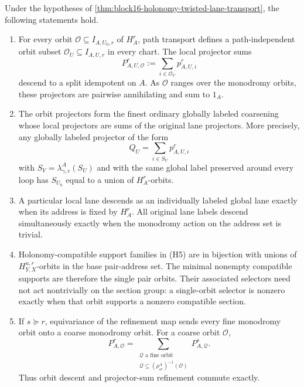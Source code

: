 \begin{theorem}
\label{thm:block16-orbit-descent}
Under the hypotheses of
\cref{thm:block16-holonomy-twisted-lane-transport}, the following statements
hold.

\begin{enumerate}[label=\textup{(O\arabic*)}]
\item For every orbit \(\mathcal O\subseteq I_{A,U_0,r}\) of \(H_A^r\), path
transport defines a path-independent orbit subset
\(\mathcal O_U\subseteq I_{A,U,r}\) in every chart.  The local projector sums
\[
 P^r_{A,U,\mathcal O}
 :=
 \sum_{i\in\mathcal O_U}p^r_{A,U,i}
\]
descend to a split idempotent on \(A\).  As \(\mathcal O\) ranges over the
monodromy orbits, these projectors are pairwise annihilating and sum to
\(1_A\).

\item The orbit projectors form the finest ordinary globally labeled
coarsening whose local projectors are sums of the original lane projectors.
More precisely, any globally labeled projector of the form
\[
 Q_U=\sum_{i\in S_U}p^r_{A,U,i}
\]
with \(S_V=\lambda^A_{\gamma,r}(S_U)\) and with the same global label preserved
around every loop has \(S_{U_0}\) equal to a union of \(H_A^r\)-orbits.

\item A particular local lane descends as an individually labeled global lane
exactly when its address is fixed by \(H_A^r\).  All original lane labels
descend simultaneously exactly when the monodromy action on the address set is
trivial.

\item Holonomy-compatible support families in (H5) are in bijection with
unions of \(H_{Y,X}^{u,r}\)-orbits in the base pair-address set.  The minimal
nonempty compatible supports are therefore the single pair orbits.  Their
associated selectors need not act nontrivially on the section group: a
single-orbit selector is nonzero exactly when that orbit supports a nonzero
compatible section.

\item If \(s\succeq r\), equivariance of the refinement map sends every fine
monodromy orbit onto a coarse monodromy orbit.  For a coarse orbit
\(\mathcal O\),
\[
 P^r_{A,\mathcal O}
 =
 \sum_{\substack{\mathcal Q\text{ a fine orbit}\\
 \mathcal Q\subseteq(\rho^A_{sr})^{-1}(\mathcal O)}}
 P^s_{A,\mathcal Q}.
\]
Thus orbit descent and projector-sum refinement commute exactly.
\end{enumerate}
\end{theorem}

